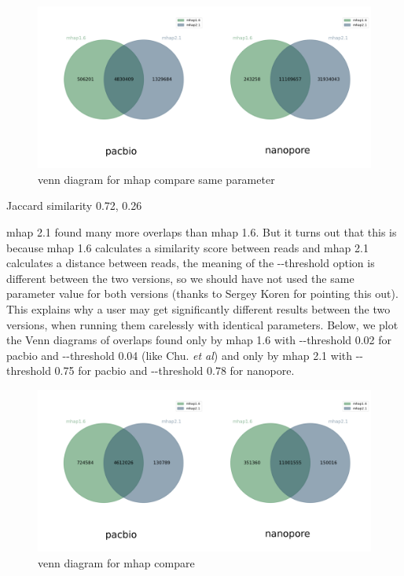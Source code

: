 \documentclass[./main.tex]{subfiles}
\begin{document}
\begin{figure}[ht]
\centering
\includegraphics[width=\textwidth]{paper/blog_post/mhap_venn_same.png}
\caption{venn diagram for mhap compare same parameter}
\end{figure}

Jaccard similarity 0.72, 0.26

mhap 2.1 found many more overlaps than mhap 1.6. But it turns out that
this is because mhap 1.6 calculates a similarity score between reads and
mhap 2.1 calculates a distance between reads, the meaning of the
-\/-threshold option is different between the two versions, so we should
have not used the same parameter value for both versions (thanks to
Sergey Koren for pointing this out). This explains why a user may get
significantly different results between the two versions, when running
them carelessly with identical parameters. Below, we plot the Venn
diagrams of overlaps found only by mhap 1.6 with -\/-threshold 0.02 for
pacbio and -\/-threshold 0.04 (like Chu. \emph{et al}) and only by mhap
2.1 with -\/-threshold 0.75 for pacbio and -\/-threshold 0.78 for
nanopore.

\begin{figure}[ht]
\centering
\includegraphics[width=\textwidth]{paper/blog_post/mhap_venn.png}
\caption{venn diagram for mhap compare}
\end{figure}
\end{document}
